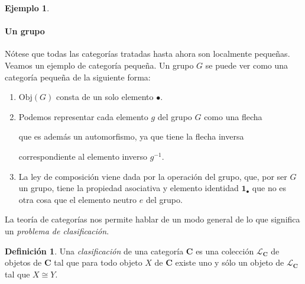 \documentclass[12pt,a4paper]{book}
\theoremstyle{definition} \newtheorem{defn}[thm]{Definición}
\theoremstyle{definition} \newtheorem{ejemplo}[thm]{Ejemplo}
\theoremstyle{definition} \newtheorem{ejercicio}[thm]{Ejercicio}
\theoremstyle{remark} \newtheorem*{obs}{Observación}
\def\id{\mathbf{1}}
\def\obj{\mathrm{Obj}}
\def\cat{\mathbf{C}}
\begin{document}
\begin{ejemplo}
 

  \paragraph{Un grupo} Nótese que todas las categorías tratadas hasta ahora son localmente pequeñas. Veamos un ejemplo de categoría pequeña. Un grupo $G$ se puede ver como una categoría pequeña de la siguiente forma:
  \begin{enumerate}
    \item $\obj(G)$ consta de un solo elemento $\bullet$.
    \item Podemos representar cada elemento $g$ del grupo $G$ como una flecha
      \begin{center}
      \end{center}
      que es además un automorfismo, ya que tiene la flecha inversa
      \begin{center}
      \end{center}
      correspondiente al elemento inverso $g^{-1}$.
    \item La ley de composición viene dada por la operación del grupo, que, por ser $G$ un grupo, tiene la propiedad asociativa y elemento identidad $\id_{\bullet}$ que no es otra cosa que el elemento neutro $e$ del grupo.
  \end{enumerate}
\end{ejemplo}

La teoría de categorías nos permite hablar de un modo general de lo que significa un \emph{problema de clasificación}.

\begin{defn}
  Una \emph{clasificación} de una categoría $\cat$ es una colección $\mathcal{L}_{\cat}$ de objetos de $\cat$ tal que para todo objeto $X$ de $\cat$ existe uno y sólo un objeto de $\mathcal{L}_{\cat}$ tal que $X\cong Y$. 
\end{defn}
\end{document}

